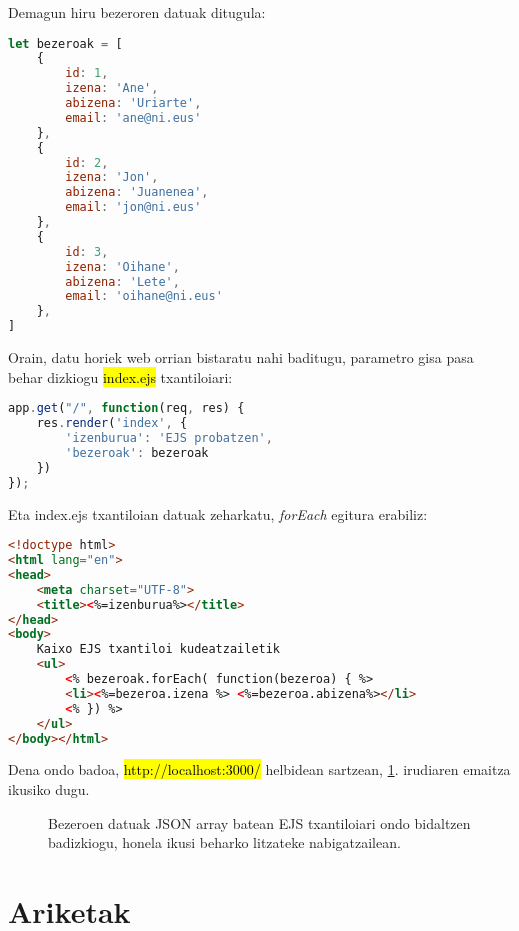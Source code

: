 Demagun hiru bezeroren datuak ditugula:

\begin{lstlisting}[language=JavaScript, numbers=none]
let bezeroak = [
    {
        id: 1,
        izena: 'Ane',
        abizena: 'Uriarte',
        email: 'ane@ni.eus'
    },
    {
        id: 2,
        izena: 'Jon',
        abizena: 'Juanenea',
        email: 'jon@ni.eus'
    },
    {
        id: 3,
        izena: 'Oihane',
        abizena: 'Lete',
        email: 'oihane@ni.eus'
    },
]
\end{lstlisting}

Orain, datu horiek web orrian bistaratu nahi baditugu, parametro gisa pasa behar dizkiogu \hl{index.ejs} txantiloiari:

\begin{lstlisting}[language=JavaScript, numbers=none]
app.get("/", function(req, res) {
    res.render('index', {
        'izenburua': 'EJS probatzen',
        'bezeroak': bezeroak
    })
});
\end{lstlisting}

Eta index.ejs txantiloian datuak zeharkatu, \textit{forEach} egitura erabiliz:

\begin{lstlisting}[language=HTML, numbers=none]
<!doctype html>
<html lang="en">
<head>
    <meta charset="UTF-8">
    <title><%=izenburua%></title>
</head>
<body>
    Kaixo EJS txantiloi kudeatzailetik
    <ul>
        <% bezeroak.forEach( function(bezeroa) { %>
        <li><%=bezeroa.izena %> <%=bezeroa.abizena%></li>
        <% }) %>
    </ul>
</body></html>
\end{lstlisting}

Dena ondo badoa, \hl{http://localhost:3000/} helbidean sartzean, \ref{fig:txantiloia-ejs}. irudiaren emaitza ikusiko dugu.

\begin{figure}[ht]
	\centering
{}
\caption{Bezeroen datuak JSON array batean EJS txantiloiari ondo bidaltzen badizkiogu, honela ikusi beharko litzateke nabigatzailean.}
\label{fig:txantiloia-ejs}
\end{figure}

\section{Ariketak}

